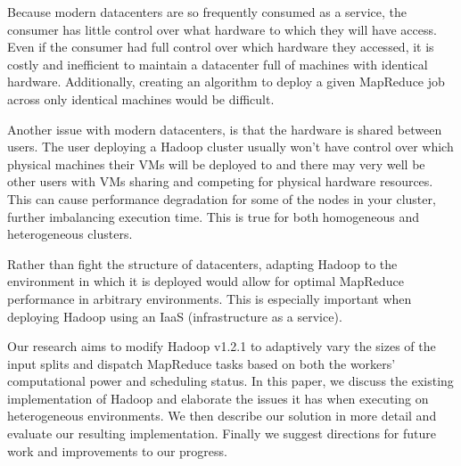 \documentclass{sig-alternate}
\begin{document}
Because modern datacenters are so frequently consumed as a service, the consumer
has little control over what hardware to which they will have access. Even if the
consumer had full control over which hardware they accessed, it is costly and
inefficient to maintain a datacenter full of machines with identical hardware.
Additionally, creating an algorithm to deploy a given MapReduce job across only
identical machines would be difficult.

Another issue with modern datacenters, is that the hardware is shared between users.
The user deploying a Hadoop cluster usually won't have control over which physical
machines their VMs will be deployed to and there may very well be other users with
VMs sharing and competing for physical hardware resources. This can cause performance
degradation for some of the nodes in your cluster, further imbalancing execution time.
This is true for both homogeneous and heterogeneous clusters.

Rather than fight the structure of datacenters, adapting Hadoop to the environment
in which it is deployed would allow for optimal MapReduce performance in arbitrary
environments. This is especially important when deploying Hadoop using an IaaS
(infrastructure as a service).

Our research aims to modify Hadoop v1.2.1 to adaptively vary the sizes of the input
splits and dispatch MapReduce tasks based on both the workers' computational power
and scheduling status. In this paper, we discuss the existing implementation of Hadoop
and elaborate the issues it has when executing on heterogeneous environments. We then
describe our solution in more detail and evaluate our resulting implementation. Finally
we suggest directions for future work and improvements to our progress.








{}

\end{document}

